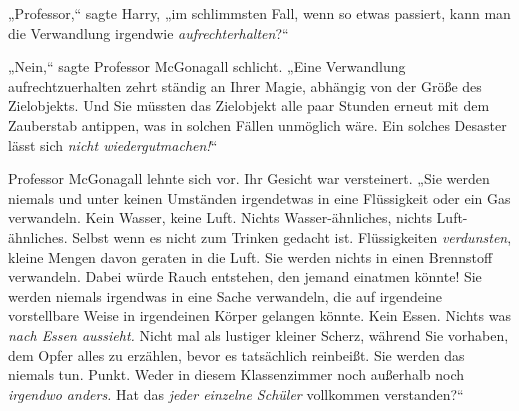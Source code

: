 „Professor,“ sagte Harry, „im schlimmsten Fall, wenn so etwas passiert, kann man die Verwandlung irgendwie \emph{aufrechterhalten}?“

„Nein,“ sagte Professor McGonagall schlicht. „Eine Verwandlung aufrechtzuerhalten zehrt ständig an Ihrer Magie, abhängig von der Größe des Zielobjekts. Und Sie müssten das Zielobjekt alle paar Stunden erneut mit dem Zauberstab antippen, was in solchen Fällen unmöglich wäre. Ein solches Desaster lässt sich \emph{nicht wiedergutmachen!}“

Professor McGonagall lehnte sich vor. Ihr Gesicht war versteinert. „Sie werden niemals und unter keinen Umständen irgendetwas in eine Flüssigkeit oder ein Gas verwandeln. Kein Wasser, keine Luft. Nichts Wasser-ähnliches, nichts Luft-ähnliches. Selbst wenn es nicht zum Trinken gedacht ist. Flüssigkeiten \emph{verdunsten}, kleine Mengen davon geraten in die Luft. Sie werden nichts in einen Brennstoff verwandeln. Dabei würde Rauch entstehen, den jemand einatmen könnte! Sie werden niemals irgendwas in eine Sache verwandeln, die auf irgendeine vorstellbare Weise in irgendeinen Körper gelangen könnte. Kein Essen. Nichts was \emph{nach Essen aussieht.} Nicht mal als lustiger kleiner Scherz, während Sie vorhaben, dem Opfer alles zu erzählen, bevor es tatsächlich reinbeißt. Sie werden das niemals tun. Punkt. Weder in diesem Klassenzimmer noch außerhalb noch \emph{irgendwo anders.} Hat das \emph{jeder einzelne Schüler} vollkommen verstanden?“

